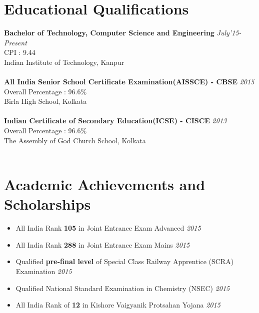 \documentclass[11pt,a4paper]{moderncv}
\newcommand{\education}[5]{
  \textbf{\large{#1}} \hfill\textit{#2}\\
  #3 : #4\\
  #5\\
  \\
}
\newcommand{\achievement}[2]{
  \item #1 \hfill \textit{#2}\vspace{2mm}
}
\begin{document}
  \makecvtitle
  \section{Educational Qualifications}
    \education{Bachelor of Technology, Computer Science and Engineering}{July'15-Present}{CPI}{9.44}{Indian Institute of Technology, Kanpur}
    \education{All India Senior School Certificate Examination(AISSCE) - CBSE}{2015}{Overall Percentage}{96.6\%}{Birla High School, Kolkata}
    \education{Indian Certificate of Secondary Education(ICSE) - CISCE}{2013}{Overall Percentage}{96.6\%}{The Assembly of God Church School, Kolkata}
  \section{Academic Achievements and Scholarships}
    \begin{itemize}
      \achievement{All India Rank \textbf{105} in Joint Entrance Exam Advanced}{2015}
      \achievement{All India Rank \textbf{288} in Joint Entrance Exam Mains}{2015}
      \achievement{Qualified \textbf{pre-final level} of Special Class Railway Apprentice (SCRA) Examination}{2015}
      \achievement{Qualified National Standard Examination in Chemistry (NSEC)}{2015}
      \achievement{All India Rank of \textbf{12} in Kishore Vaigyanik Protsahan Yojana}{2015}
    \end{itemize}
\end{document}
